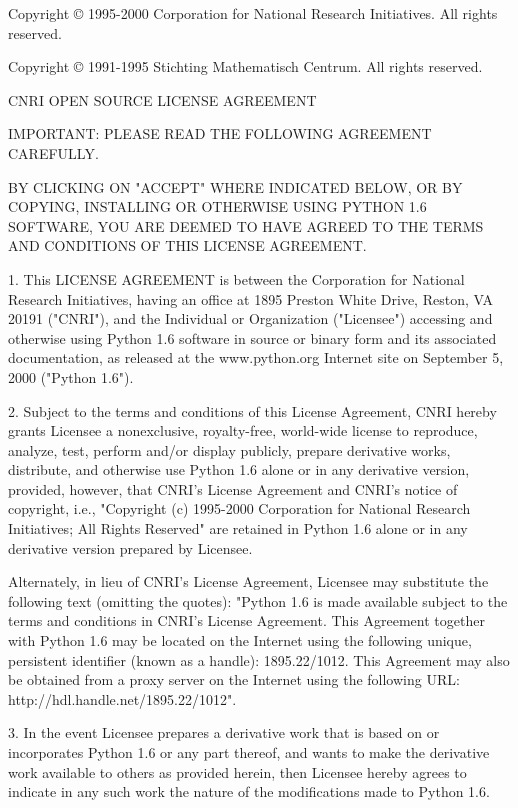 Copyright \copyright{} 1995-2000 Corporation for National Research
Initiatives.  All rights reserved.

Copyright \copyright{} 1991-1995 Stichting Mathematisch Centrum.  All
rights reserved.

CNRI OPEN SOURCE LICENSE AGREEMENT


IMPORTANT: PLEASE READ THE FOLLOWING AGREEMENT CAREFULLY.

BY CLICKING ON "ACCEPT" WHERE INDICATED BELOW, OR BY COPYING,
INSTALLING OR OTHERWISE USING PYTHON 1.6 SOFTWARE, YOU ARE DEEMED TO
HAVE AGREED TO THE TERMS AND CONDITIONS OF THIS LICENSE AGREEMENT.

1. This LICENSE AGREEMENT is between the Corporation for National
Research Initiatives, having an office at 1895 Preston White Drive,
Reston, VA 20191 ("CNRI"), and the Individual or Organization
("Licensee") accessing and otherwise using Python 1.6 software in
source or binary form and its associated documentation, as released at
the www.python.org Internet site on September 5, 2000 ("Python 1.6").

2. Subject to the terms and conditions of this License Agreement, CNRI
hereby grants Licensee a nonexclusive, royalty-free, world-wide
license to reproduce, analyze, test, perform and/or display publicly,
prepare derivative works, distribute, and otherwise use Python 1.6
alone or in any derivative version, provided, however, that CNRI's
License Agreement and CNRI's notice of copyright, i.e., "Copyright (c)
1995-2000 Corporation for National Research Initiatives; All Rights
Reserved" are retained in Python 1.6 alone or in any derivative
version prepared by Licensee.

Alternately, in lieu of CNRI's License Agreement, Licensee may
substitute the following text (omitting the quotes): "Python 1.6 is
made available subject to the terms and conditions in CNRI's License
Agreement.  This Agreement together with Python 1.6 may be located on
the Internet using the following unique, persistent identifier (known
as a handle): 1895.22/1012.  This Agreement may also be obtained from a
proxy server on the Internet using the following URL:
http://hdl.handle.net/1895.22/1012".

3. In the event Licensee prepares a derivative work that is based on
or incorporates Python 1.6 or any part thereof, and wants to make the
derivative work available to others as provided herein, then Licensee
hereby agrees to indicate in any such work the nature of the
modifications made to Python 1.6.

